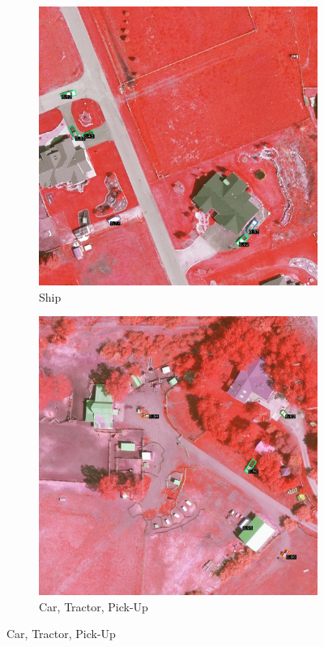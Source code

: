 \begin{figure}[h!]
    \begin{subfigure}[t]{0.38\textwidth}
        \centering
        \includegraphics[width=\linewidth]{images/015Results/02perm_exp/comp_images/rirb/509.png}
        \caption{Ship}
    \end{subfigure}
    \begin{subfigure}[t]{0.38\textwidth}
        \centering
        \includegraphics[width=\linewidth]{images/015Results/02perm_exp/comp_images/rirb/523.png}
        \caption{Car, Tractor, Pick-Up}
    \end{subfigure}
    

\end{figure}
